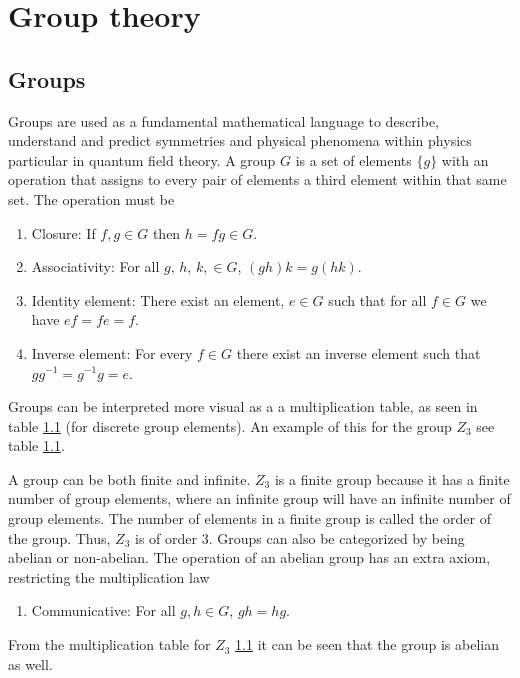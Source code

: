 \section{Group theory}
\subsection{Groups}
Groups are used as a fundamental mathematical language to describe, understand and predict symmetries and physical phenomena within physics particular in quantum field theory. A group $G$  is a set of elements $\{g\}$ with an operation that assigns to every pair of elements a third element within that same set. The operation must be 
\begin{enumerate}
    \item Closure: If $f,g \in G$ then $h=fg\in G$.
    \item Associativity: For all $g,\,h,\,k,\in G$, $(gh)k=g(hk)$.
    \item Identity element: There exist an element, $e\in G$ such that for all $f\in G$ we have $ef=fe=f$.
    \item Inverse element: For every $f\in G$ there exist an inverse element such that $gg^{-1}=g^{-1}g=e$.
\end{enumerate}
Groups can be interpreted more visual as a a multiplication table, as seen in table \ref{} (for discrete group elements). An example of this for the group $Z_3$ see table \ref{}.

A group can be both finite and infinite. $Z_3$ is a finite group because it has a finite number of group elements, where an infinite group will have an infinite number of group elements. The number of elements in a finite group is called the order of the group. Thus, $Z_3$ is of order $3$. Groups can also be categorized by being abelian or non-abelian. The operation of an abelian group has an extra axiom, restricting the multiplication law
\begin{enumerate}
    \item Communicative: For all $g,h\in G$, $gh=hg$.
\end{enumerate}
From the multiplication table for $Z_3$ \ref{} it can be seen that the group is abelian as well. 

